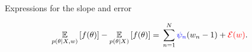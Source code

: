     

\begin{frame}[t]{Expressions for the slope and error}

%
\begin{align*}
\expect{p(\theta \vert \xvec, \w)}{f(\theta)} -
    \expect{p(\theta \vert \xvec)}{f(\theta)} ={}&
    \sumn \blue{\infl_n} (\w_n - 1) +
    \red{\err(\w)}.
%
\end{align*}       
%

\pause


\end{frame}
